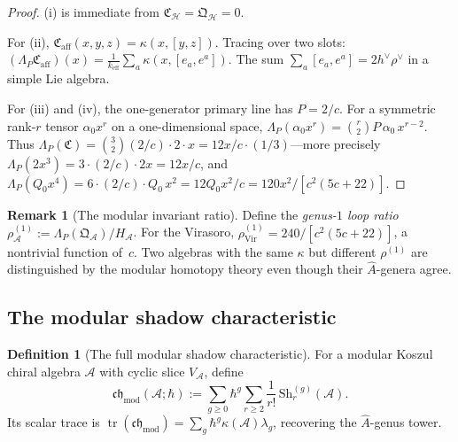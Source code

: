 \documentclass[11pt,oneside]{memoir}
\numberwithin{equation}{chapter}
\theoremstyle{definition}
\newtheorem{definition}[theorem]{Definition}
\newtheorem{remark}[theorem]{Remark}
\newcommand{\cA}{\mathcal A}
\begin{document}
\begin{proof}
\textup{(i)} is immediate from $\mathfrak C_{\mathcal H}=\mathfrak Q_{\mathcal H}=0$.

For \textup{(ii)}, $\mathfrak C_{\mathrm{aff}}(x,y,z)=\kappa(x,[y,z])$.  Tracing over two slots:
$(\Lambda_P\mathfrak C_{\mathrm{aff}})(x)
=\frac{1}{k_{\mathrm{eff}}}\sum_a \kappa(x,[e_a,e^a])$.
The sum $\sum_a [e_a,e^a]=2h^\vee\rho^\vee$ in a simple Lie algebra.

For \textup{(iii)} and \textup{(iv)}, the one-generator primary line has $P=2/c$.  For a symmetric rank-$r$ tensor $\alpha_0 x^r$ on a one-dimensional space, $\Lambda_P(\alpha_0 x^r)=\binom{r}{2}P\,\alpha_0\,x^{r-2}$.  Thus $\Lambda_P(\mathfrak C)=\binom{3}{2}(2/c)\cdot 2\cdot x=12x/c\cdot(1/3)$---more precisely $\Lambda_P(2x^3)=3\cdot (2/c)\cdot 2 x= 12x/c$, and $\Lambda_P(Q_0 x^4)=6\cdot(2/c)\cdot Q_0\, x^2=12Q_0 x^2/c=120x^2/[c^2(5c+22)]$.\qedhere
\end{proof}

\begin{remark}[The modular invariant ratio]
\label{rem:nms-modular-invariant-ratio}
Define the \emph{genus-$1$ loop ratio}
$\rho^{(1)}_{\cA}:=\Lambda_P(\mathfrak Q_{\cA})/H_{\cA}$.
For the Virasoro, $\rho^{(1)}_{\mathrm{Vir}}=240/[c^2(5c+22)]$, a nontrivial function of~$c$.  Two algebras with the same $\kappa$ but different $\rho^{(1)}$ are distinguished by the modular homotopy theory even though their $\hat{A}$-genera agree.
\end{remark}

\subsection{The modular shadow characteristic}
\label{subsec:nms-modular-chern-character}

\begin{definition}[The full modular shadow characteristic]
\label{def:nms-full-modular-shadow-characteristic}
For a modular Koszul chiral algebra $\cA$ with cyclic slice $V_{\cA}$, define
\begin{equation}
\label{eq:nms-modular-shadow-characteristic}
\mathfrak{ch}_{\mathrm{mod}}(\cA;\hbar)
:=
\sum_{g\ge 0}\hbar^g\sum_{r\ge 2}\frac{1}{r!}\,\mathrm{Sh}_r^{(g)}(\cA).
\end{equation}
Its scalar trace is $\operatorname{tr}(\mathfrak{ch}_{\mathrm{mod}})=\sum_g \hbar^g\kappa(\cA)\lambda_g$, recovering the $\hat{A}$-genus tower.
\end{definition}
\end{document}
